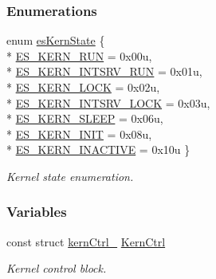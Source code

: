 \subsubsection*{Enumerations}
\begin{DoxyCompactItemize}
\item 
enum \hyperlink{group__kern__ctrl_gac9be6bfeddbd6af148cdb3867fbc24af}{es\-Kern\-State} \{ \\*
\hyperlink{group__kern__ctrl_ggac9be6bfeddbd6af148cdb3867fbc24afa31a7e1ee10bcd82aaf8f5eca06ecdbe8}{E\-S\-\_\-\-K\-E\-R\-N\-\_\-\-R\-U\-N} = 0x00u, 
\\*
\hyperlink{group__kern__ctrl_ggac9be6bfeddbd6af148cdb3867fbc24afa62e34103bea61ea0b7a9816180a43905}{E\-S\-\_\-\-K\-E\-R\-N\-\_\-\-I\-N\-T\-S\-R\-V\-\_\-\-R\-U\-N} = 0x01u, 
\\*
\hyperlink{group__kern__ctrl_ggac9be6bfeddbd6af148cdb3867fbc24afa4e5b5c809ea9cdbae536b701003278cc}{E\-S\-\_\-\-K\-E\-R\-N\-\_\-\-L\-O\-C\-K} = 0x02u, 
\\*
\hyperlink{group__kern__ctrl_ggac9be6bfeddbd6af148cdb3867fbc24afa2b35c503975df4c289e9cbff3e815f8b}{E\-S\-\_\-\-K\-E\-R\-N\-\_\-\-I\-N\-T\-S\-R\-V\-\_\-\-L\-O\-C\-K} = 0x03u, 
\\*
\hyperlink{group__kern__ctrl_ggac9be6bfeddbd6af148cdb3867fbc24afad45a94c8b4975fd162d683201a75cceb}{E\-S\-\_\-\-K\-E\-R\-N\-\_\-\-S\-L\-E\-E\-P} = 0x06u, 
\\*
\hyperlink{group__kern__ctrl_ggac9be6bfeddbd6af148cdb3867fbc24afacad35dc43528f96d27696db584f05cff}{E\-S\-\_\-\-K\-E\-R\-N\-\_\-\-I\-N\-I\-T} = 0x08u, 
\\*
\hyperlink{group__kern__ctrl_ggac9be6bfeddbd6af148cdb3867fbc24afa089165cac55f315953335f5ffe41b7c4}{E\-S\-\_\-\-K\-E\-R\-N\-\_\-\-I\-N\-A\-C\-T\-I\-V\-E} = 0x10u
 \}
\begin{DoxyCompactList}\small\item\em Kernel state enumeration. \end{DoxyCompactList}\end{DoxyCompactItemize}
\subsubsection*{Variables}
\begin{DoxyCompactItemize}
\item 
const struct \hyperlink{structkernCtrl__}{kern\-Ctrl\-\_\-} \hyperlink{group__kern__ctrl_ga93a7ee7768ffd94201bf1795a543194b}{Kern\-Ctrl}
\begin{DoxyCompactList}\small\item\em Kernel control block. \end{DoxyCompactList}\end{DoxyCompactItemize}


